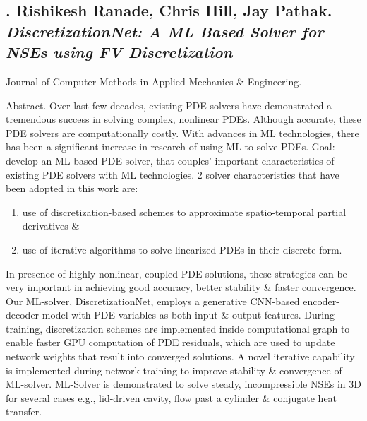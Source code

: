 \documentclass{article}
\begin{document}
\subsection{\cite{Ranade_Hill_Pathak2021}. {\sc Rishikesh Ranade, Chris Hill, Jay Pathak}. {\it DiscretizationNet: A ML Based Solver for NSEs using FV Discretization}}
Journal of Computer Methods in Applied Mechanics \& Engineering. {\sf[139 citations]}

{\sf Abstract.} Over last few decades, existing PDE solvers have demonstrated a tremendous success in solving complex, nonlinear PDEs. Although accurate, these PDE solvers are computationally costly. With advances in ML technologies, there has been a significant increase in research of using ML to solve PDEs. Goal: develop an ML-based PDE solver, that couples' important characteristics of existing PDE solvers with ML technologies. 2 solver characteristics that have been adopted in this work are:
\begin{enumerate}
	\item use of discretization-based schemes to approximate spatio-temporal partial derivatives \&
	\item use of iterative algorithms to solve linearized PDEs in their discrete form.
\end{enumerate}
In presence of highly nonlinear, coupled PDE solutions, these strategies can be very important in achieving good accuracy, better stability \& faster convergence. Our ML-solver, DiscretizationNet, employs a generative CNN-based encoder-decoder model with PDE variables as both input \& output features. During training, discretization schemes are implemented inside computational graph to enable faster GPU computation of PDE residuals, which are used to update network weights that result into converged solutions. A novel iterative capability is implemented during network training to improve stability \& convergence of ML-solver. ML-Solver is demonstrated to solve steady, incompressible NSEs in 3D for several cases e.g., lid-driven cavity, flow past a cylinder \& conjugate heat transfer.
\end{document}
